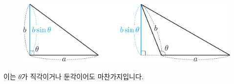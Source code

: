 \begin{figure}[h]
  \centering \includegraphics[scale=0.125]{pic0/pic166.pdf}\\
  \end{figure}
이는 $\theta$가 직각이거나 둔각이어도 마찬가지입니다.
